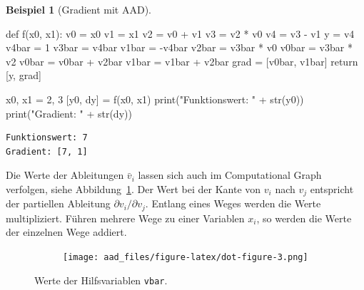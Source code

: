 \documentclass[
  a4paper,
  DIV=11]{scrreprt}
\newenvironment{Shaded}{\begin{snugshade}}{\end{snugshade}}
\newcommand{\BuiltInTok}[1]{\textcolor[rgb]{0.00,0.23,0.31}{#1}}
\newcommand{\ControlFlowTok}[1]{\textcolor[rgb]{0.00,0.23,0.31}{#1}}
\newcommand{\DecValTok}[1]{\textcolor[rgb]{0.68,0.00,0.00}{#1}}
\newcommand{\KeywordTok}[1]{\textcolor[rgb]{0.00,0.23,0.31}{#1}}
\newcommand{\NormalTok}[1]{\textcolor[rgb]{0.00,0.23,0.31}{#1}}
\newcommand{\OperatorTok}[1]{\textcolor[rgb]{0.37,0.37,0.37}{#1}}
\newcommand{\StringTok}[1]{\textcolor[rgb]{0.13,0.47,0.30}{#1}}
\theoremstyle{definition}
\theoremstyle{definition}
\newtheorem{example}{Beispiel}[chapter]
\theoremstyle{remark}
\begin{document}
\begin{example}[Gradient mit
AAD]
\begin{Shaded}
\begin{Highlighting}[]
\KeywordTok{def}\NormalTok{ f(x0, x1):}
\NormalTok{    v0 }\OperatorTok{=}\NormalTok{ x0}
\NormalTok{    v1 }\OperatorTok{=}\NormalTok{ x1}
\NormalTok{    v2 }\OperatorTok{=}\NormalTok{ v0 }\OperatorTok{+}\NormalTok{ v1}
\NormalTok{    v3 }\OperatorTok{=}\NormalTok{ v2 }\OperatorTok{*}\NormalTok{ v0}
\NormalTok{    v4 }\OperatorTok{=}\NormalTok{ v3 }\OperatorTok{{-}}\NormalTok{ v1}
\NormalTok{    y }\OperatorTok{=}\NormalTok{ v4}
\NormalTok{    v4bar }\OperatorTok{=} \DecValTok{1}
\NormalTok{    v3bar }\OperatorTok{=}\NormalTok{ v4bar}
\NormalTok{    v1bar }\OperatorTok{=} \OperatorTok{{-}}\NormalTok{v4bar}
\NormalTok{    v2bar }\OperatorTok{=}\NormalTok{ v3bar }\OperatorTok{*}\NormalTok{ v0}
\NormalTok{    v0bar }\OperatorTok{=}\NormalTok{ v3bar }\OperatorTok{*}\NormalTok{ v2}
\NormalTok{    v0bar }\OperatorTok{=}\NormalTok{ v0bar }\OperatorTok{+}\NormalTok{ v2bar}
\NormalTok{    v1bar }\OperatorTok{=}\NormalTok{ v1bar }\OperatorTok{+}\NormalTok{ v2bar}
\NormalTok{    grad }\OperatorTok{=}\NormalTok{ [v0bar, v1bar]}
    \ControlFlowTok{return}\NormalTok{ [y, grad]}

\NormalTok{x0, x1 }\OperatorTok{=} \DecValTok{2}\NormalTok{, }\DecValTok{3}
\NormalTok{[y0, dy] }\OperatorTok{=}\NormalTok{ f(x0, x1)}
\BuiltInTok{print}\NormalTok{(}\StringTok{"Funktionswert: "} \OperatorTok{+} \BuiltInTok{str}\NormalTok{(y0))}
\BuiltInTok{print}\NormalTok{(}\StringTok{"Gradient: "} \OperatorTok{+} \BuiltInTok{str}\NormalTok{(dy))}
\end{Highlighting}
\end{Shaded}

\begin{verbatim}
Funktionswert: 7
Gradient: [7, 1]
\end{verbatim}

Die Werte der Ableitungen \(\bar v_i\) lassen sich auch im Computational
Graph verfolgen, siehe Abbildung~\ref{fig-compTreeMultiReversed}. Der
Wert bei der Kante von \(v_i\) nach \(v_j\) entspricht der partiellen
Ableitung \(\partial v_i / \partial v_j\). Entlang eines Weges werden
die Werte multipliziert. Führen mehrere Wege zu einer Variablen \(x_i\),
so werden die Werte der einzelnen Wege addiert.

\begin{figure}

{\centering 

\begin{figure}[H]

{\centering \texttt{[image: aad\_files/figure-latex/dot-figure-3.png]}

}

\end{figure}

}

\caption{\label{fig-compTreeMultiReversed}Werte der Hilfsvariablen
\texttt{vbar}.}

\end{figure}

\end{example}
\end{document}
